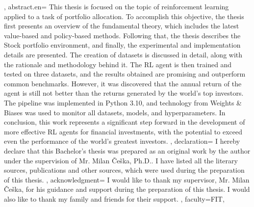 {{    }, %
    abstract.en={
        This thesis is focused on the topic of reinforcement learning applied to a task of portfolio allocation. To accomplish this objective, the thesis first presents an overview of the fundamental theory, which includes the latest value-based and policy-based methods. Following that, the thesis describes the Stock portfolio environment, and finally, the experimental and implementation details are presented. The creation of datasets is discussed in detail, along with the rationale and methodology behind it. The RL agent is then trained and tested on three datasets, and the results obtained are promising and outperform common benchmarks. However, it was discovered that the annual return of the agent is still not better than the returns generated by the world's top investors. The pipeline was implemented in Python 3.10, and technology from Weights \& Biases was used to monitor all datasets, models, and hyperparameters. In conclusion, this work represents a significant step forward in the development of more effective RL agents for financial investments, with the potential to exceed even the performance of the world's greatest investors.
    }, %
    declaration={
        I hereby declare that this Bachelor's thesis was prepared as an original work by the author under the supervision of Mr. Milan Češka, Ph.D.. I have listed all the literary sources, publications and other sources, which were used during the preparation of this thesis.
    },
%
    acknowledgment={
        I would like to thank my supervisor, Mr. Milan Češka, for his guidance and support during the preparation of this thesis. I would also like to thank my family and friends for their support.
    },
%
%        
%
    faculty={FIT}, %
}
